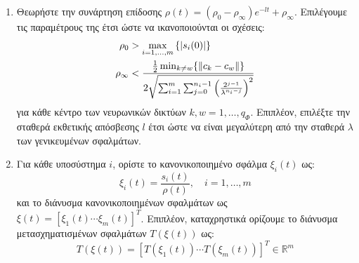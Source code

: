 \begin{enumerate}[label=\Roman*., ref=\Roman*]
	
	\item \label{step:performance_selection}
	Θεωρήστε την συνάρτηση επίδοσης $\rho(t) = ( \rho_0 - \rho_{\infty} ) e^{-l t} + \rho_{\infty}$. Επιλέγουμε τις παραμέτρους της έτσι ώστε να ικανοποιούνται οι σχέσεις:
	\begin{equation}
	\begin{split}
		\rho_0 &> \max_{i = 1,\dots,m} 
		\left\{ \abs{s_i(0)} \right\} \\
		\rho_{\infty} &<
		\frac
		{\frac{1}{2} \min_{k \neq w} \{ \norm{c_k - c_w}\}}
		{ 2 \sqrt{\sum_{i = 1}^{m}\sum_{j = 0}^{n_i - 1}     
				\left( \frac{2^{j-1}}{\lambda^{n_i - j}} \right)^2}}
	\end{split}
	\end{equation}
	για κάθε κέντρο των νευρωνικών δικτύων $k,w = 1,\dots,q_\Phi$. Επιπλέον, επιλέξτε την σταθερά εκθετικής απόσβεσης $l$ έτσι ώστε να είναι μεγαλύτερη από την σταθερά $\lambda$ των γενικευμένων σφαλμάτων.
	
	
	
	
	\item \label{step:nomralized_errors}
	Για κάθε υποσύστημα $i$, ορίστε το κανονικοποιημένο σφάλμα $\xi_i(t)$ ως:
	\begin{equation*}
	\xi_i(t) = \frac{s_i(t)}{\rho(t)},\quad i = 1,\dots,m
	\end{equation*}
	και το διάνυσμα κανονικοποιημένων σφαλμάτων ως $\xi(t) = [\xi_1(t) \cdots \xi_m(t)]^T$. Επιπλέον, καταχρηστικά ορίζουμε το διάνυσμα μετασχηματισμένων σφαλμάτων $T(\xi(t))$ ως: 
	\begin{equation*}
	T(\xi(t)) = \left[T(\xi_1(t)) \cdots  T(\xi_m(t)) \right]^T
	\in \mathbb{R}^m
	\end{equation*}
	

\end{enumerate}
